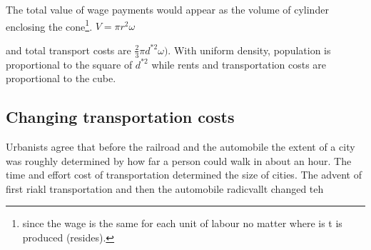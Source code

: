 The total value of wage payments would appear as the volume of cylinder enclosing the cone\footnote{since the wage is the same for each unit of labour no matter where is t is produced (resides).}.  
$V=\pi r^2 \omega$


 \vspace{1cm}

\begin{figure}
    \begin{center}
    
    \caption{}
    \label{fig:city_conical}
    \end{center}
\end{figure}




 \vspace{1cm}
and total transport costs are 
$\frac{2}{3}\pi  d^{*2} \omega).$
With uniform density, population is proportional to the square of  $d^{*2}$ while rents and  transportation costs are proportional to the cube. 

\subsection {Changing transportation costs}

Urbanists agree that before the railroad and the automobile the extent of a city was roughly determined by how far a person could walk in about an hour. The time and effort cost of transportation determined the size of cities. The advent of first riakl transportation and then the automobile radicvallt changed teh

